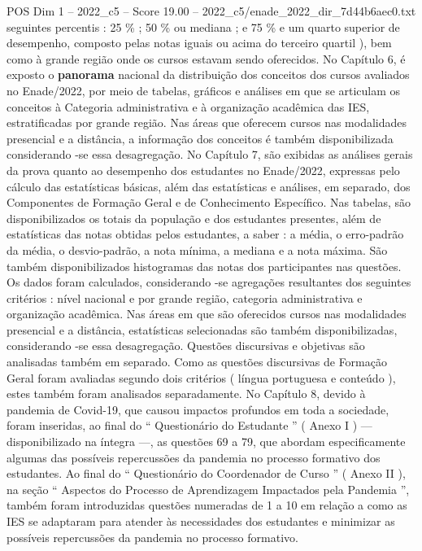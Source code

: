 \begin{textsample}{POS Dim 1 – 2022\_c5 – Score 19.00 – 2022\_c5/enade\_2022\_dir\_7d44b6aec0.txt}  \label{ex:f1_pos_029}
seguintes percentis : 25 \% ; 50 \% ou mediana ; e 75 \% e um quarto superior de desempenho, composto pelas notas iguais ou acima do terceiro quartil ), bem como à grande região onde os cursos estavam sendo oferecidos.
No Capítulo 6, é exposto o \textbf{panorama} nacional da distribuição dos conceitos dos cursos avaliados no Enade/2022, por meio de tabelas, gráficos e análises em que se articulam os conceitos à Categoria administrativa e à organização acadêmica das IES, estratificadas por grande região.
Nas áreas que oferecem cursos nas modalidades presencial e a distância, a informação dos conceitos é também disponibilizada considerando -se essa desagregação.
No Capítulo 7, são exibidas as análises gerais da prova quanto ao desempenho dos estudantes no Enade/2022, expressas pelo cálculo das estatísticas básicas, além das estatísticas e análises, em separado, dos Componentes de Formação Geral e de Conhecimento Específico.
Nas tabelas, são disponibilizados os totais da população e dos estudantes presentes, além de estatísticas das notas obtidas pelos estudantes, a saber : a média, o erro-padrão da média, o desvio-padrão, a nota mínima, a mediana e a nota máxima.
São também disponibilizados histogramas das notas dos participantes nas questões.
Os dados foram calculados, considerando -se agregações resultantes dos seguintes critérios : nível nacional e por grande região, categoria administrativa e organização acadêmica.
Nas áreas em que são oferecidos cursos nas modalidades presencial e a distância, estatísticas selecionadas são também disponibilizadas, considerando -se essa desagregação.
Questões discursivas e objetivas são analisadas também em separado.
Como as questões discursivas de Formação Geral foram avaliadas segundo dois critérios ( língua portuguesa e conteúdo ), estes também foram analisados separadamente.
No Capítulo 8, devido à pandemia de Covid-19, que causou impactos profundos em toda a sociedade, foram inseridas, ao final do “ Questionário do Estudante ” ( Anexo I ) — disponibilizado na íntegra —, as questões 69 a 79, que abordam especificamente algumas das possíveis repercussões da pandemia no processo formativo dos estudantes.
Ao final do “ Questionário do Coordenador de Curso ” ( Anexo II ), na seção “ Aspectos do Processo de Aprendizagem Impactados pela Pandemia ”, também foram introduzidas questões numeradas de 1 a 10 em relação a como as IES se adaptaram para atender às necessidades dos estudantes e minimizar as possíveis repercussões da pandemia no processo formativo.

\end{textsample}
